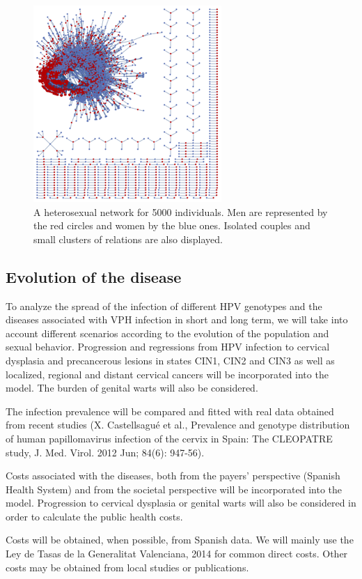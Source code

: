 \begin{figure}[ht]
	\centering
	\includegraphics[scale=0.7]{IMG/red1.png}
	\caption{A heterosexual network for 5000 individuals. Men are represented by the red circles and women by the blue ones. Isolated couples and small clusters of relations are also displayed.}
	\label{red1}
\end{figure}  

\subsection{Evolution of the disease}
To analyze the spread of the infection of different HPV genotypes and the diseases associated with VPH infection in short and long term, we will take into account different scenarios according to the evolution of the population and sexual behavior. Progression and regressions from HPV infection to cervical dysplasia and precancerous lesions in states CIN1, CIN2 and CIN3 as well as localized, regional and distant cervical cancers will be incorporated into the model.  The burden of genital warts will also be considered.

The infection prevalence will be compared and fitted with real data obtained from recent studies (X. Castellsagué et al., Prevalence and genotype distribution of human papillomavirus infection of the cervix in Spain: The CLEOPATRE study, J. Med. Virol. 2012 Jun; 84(6): 947-56). 

Costs associated with the diseases, both from the payers' perspective (Spanish Health System) and from the societal perspective will be incorporated into the model. Progression to cervical dysplasia or genital warts will also be considered in order to calculate the public health costs.
 
Costs will be obtained, when possible, from Spanish data. We will mainly use the Ley de Tasas de la Generalitat Valenciana, 2014 for common direct costs. Other costs may be obtained from local studies or publications.

